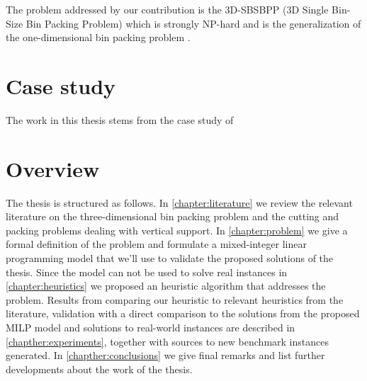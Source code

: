 The problem addressed by our contribution is the 3D-SBSBPP (3D Single Bin-Size Bin Packing Problem) which is strongly NP-hard and is the generalization of the one-dimensional bin packing problem \citep{martello2000three}.

\section*{Case study}
\label{sec:intro:case_study}%
The work in this thesis stems from the case study of 

\section*{Overview}
\label{sec:intro:overview}%
The thesis is structured as follows. 
In \cref{chapter:literature} we review the relevant literature on the three-dimensional bin packing problem and the cutting and packing problems dealing with vertical support.
In \cref{chapter:problem} we give a formal definition of the problem and formulate a mixed-integer linear programming model that we'll use to validate the proposed solutions of the thesis.
Since the model can not be used to solve real instances in \cref{chapter:heuristics} we proposed an heuristic algorithm that addresses the problem.
Results from comparing our heuristic to relevant heuristics from the literature, validation with a direct comparison to the solutions from the proposed MILP model and solutions to real-world instances are described in \cref{chapther:experiments}, together with sources to new benchmark instances generated.
In \cref{chapther:conclusions} we give final remarks and list further developments about the work of the thesis.